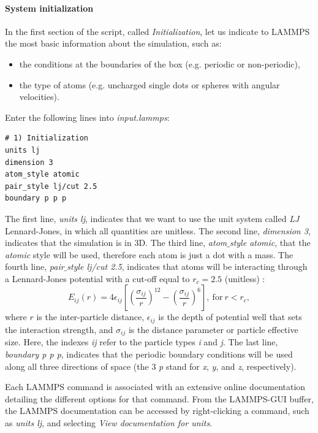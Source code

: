 \documentclass[9pt,tutorial]{livecoms}
\begin{document}
\paragraph{System initialization}
In the first section of the script, called \textit{Initialization}, let us indicate to LAMMPS the most basic information about the simulation, such as:
\begin{itemize}
\item the conditions at the boundaries of the box (e.g. periodic or non-periodic),
\item the type of atoms (e.g. uncharged single dots or spheres with angular velocities).
\end{itemize}
Enter the following lines into \textit{input.lammps}:
{\normalsize \begin{verbatim}
# 1) Initialization
units lj
dimension 3
atom_style atomic
pair_style lj/cut 2.5
boundary p p p
\end{verbatim}}
The first line, \textit{units lj}, indicates that we want to use the unit system called \textit{LJ} Lennard-Jones, in which all quantities are unitless. The second line, \textit{dimension 3}, indicates that the simulation is in 3D. The third line, \textit{atom$\_$style atomic}, that the \textit{atomic} style will be used, therefore each atom is just a dot with a mass. The fourth line, \textit{pair$\_$style lj/cut 2.5}, indicates that atoms will be interacting through a Lennard-Jones potential with a cut-off equal to $r_c = 2.5$ (unitless) \cite{wang2020lennard,fischer2023history}:
$$E_{ij} (r) = 4 \epsilon_{ij} \left[ \left( \dfrac{\sigma_{ij}}{r} \right)^{12} - \left( \dfrac{\sigma_{ij}}{r} \right)^{6} \right], ~ \text{for} ~ r < r_c,$$
where $r$ is the inter-particle distance, $\epsilon_{ij}$ is the depth of potential well that sets the interaction strength, and $\sigma_{ij}$ is the distance parameter or particle effective size. Here, the indexes \textit{ij} refer to the particle types \textit{i} and \textit{j}. The last line, \textit{boundary p p p}, indicates that the periodic boundary conditions will be used along all three directions of space (the 3 \textit{p} stand for \textit{x}, \textit{y}, and \textit{z}, respectively).

Each LAMMPS command is associated with an extensive online documentation detailing the different options for that command. From the LAMMPS-GUI buffer, the LAMMPS documentation can be accessed by right-clicking a command, such as \textit{units lj}, and selecting \textit{View documentation for units}.
\end{document}
